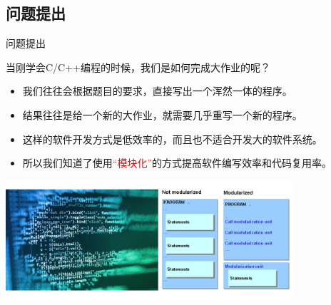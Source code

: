 \documentclass[9pt]{beamer}
\begin{document}
	\subsection{问题提出}
	\begin{frame}{问题提出}
		\begin{block}{当刚学会C/C++编程的时候，我们是如何完成大作业的呢？}
			\begin{itemize}
				\item<2-> 我们往往会根据题目的要求，直接写出一个浑然一体的程序。
				\item<2-> 结果往往是给一个新的大作业，就需要几乎重写一个新的程序。
				\item<3-> 这样的软件开发方式是低效率的，而且也不适合开发大的软件系统。
				\item<3-> 所以我们知道了使用\textcolor{red}{“模块化”}的方式提高软件编写效率和代码复用率。
			\end{itemize}
		\end{block}
		\begin{center}
			\includegraphics[width=0.8\textwidth]{./img/code}
		\end{center}
	\end{frame}
\end{document}
